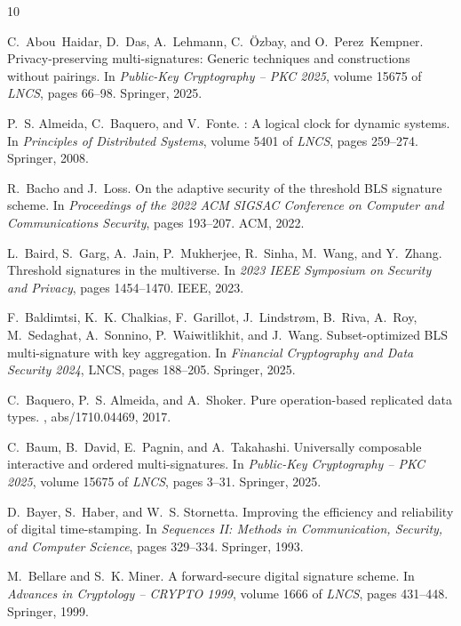 \documentclass[11pt]{article}
\theoremstyle{definition}
\begin{document}
\begin{thebibliography}{10}

C.~Abou~Haidar, D.~Das, A.~Lehmann, C.~{\"O}zbay, and O.~Perez~Kempner.
\newblock Privacy-preserving multi-signatures: Generic techniques and
  constructions without pairings.
\newblock In {\em Public-Key Cryptography -- PKC 2025}, volume 15675 of {\em
  LNCS}, pages 66--98. Springer, 2025.

P.~S. Almeida, C.~Baquero, and V.~Fonte.
: A logical clock for dynamic systems.
\newblock In {\em Principles of Distributed Systems}, volume 5401 of {\em
  LNCS}, pages 259--274. Springer, 2008.

R.~Bacho and J.~Loss.
\newblock On the adaptive security of the threshold {BLS} signature scheme.
\newblock In {\em Proceedings of the 2022 ACM SIGSAC Conference on Computer and
  Communications Security}, pages 193--207. ACM, 2022.

L.~Baird, S.~Garg, A.~Jain, P.~Mukherjee, R.~Sinha, M.~Wang, and Y.~Zhang.
\newblock Threshold signatures in the multiverse.
\newblock In {\em 2023 IEEE Symposium on Security and Privacy}, pages
  1454--1470. IEEE, 2023.

F.~Baldimtsi, K.~K. Chalkias, F.~Garillot, J.~Lindstr{\o}m, B.~Riva, A.~Roy,
  M.~Sedaghat, A.~Sonnino, P.~Waiwitlikhit, and J.~Wang.
\newblock Subset-optimized {BLS} multi-signature with key aggregation.
\newblock In {\em Financial Cryptography and Data Security 2024}, LNCS, pages
  188--205. Springer, 2025.

C.~Baquero, P.~S. Almeida, and A.~Shoker.
\newblock Pure operation-based replicated data types.
, abs/1710.04469, 2017.

C.~Baum, B.~David, E.~Pagnin, and A.~Takahashi.
\newblock Universally composable interactive and ordered multi-signatures.
\newblock In {\em Public-Key Cryptography -- PKC 2025}, volume 15675 of {\em
  LNCS}, pages 3--31. Springer, 2025.

D.~Bayer, S.~Haber, and W.~S. Stornetta.
\newblock Improving the efficiency and reliability of digital time-stamping.
\newblock In {\em Sequences II: Methods in Communication, Security, and
  Computer Science}, pages 329--334. Springer, 1993.

M.~Bellare and S.~K. Miner.
\newblock A forward-secure digital signature scheme.
\newblock In {\em Advances in Cryptology -- CRYPTO 1999}, volume 1666 of {\em
  LNCS}, pages 431--448. Springer, 1999.


\end{thebibliography}
\end{document}
